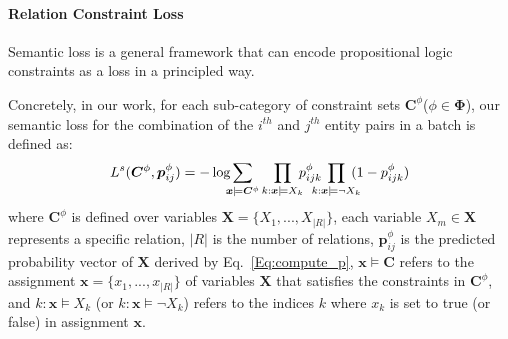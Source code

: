 \paragraph{Relation Constraint Loss}
Semantic loss is a general framework that can encode propositional logic constraints as a loss in a principled way.

Concretely, in our work, for each sub-category of constraint sets $\bm{C}^{\phi}$($\phi \in \bm{\Phi}$), our semantic loss for the combination of the $i^{th}$ and $j^{th}$ entity pairs in a batch is defined as:
\begin{equation}
\label{seq:semantic_loss}
	L^{s}(\bm{C}^{\phi}, \bm{p}^{\phi}_{ij}) = -\log\hspace{-0.5em}\sum\limits_{\bm x\models\bm{C}^{\phi}}\prod\limits_{k:\bm x\models X_k}\hspace{-0.5em}p^{\phi}_{ijk}\hspace{-0.9em}\prod\limits_{k:\bm x\models \neg X_k}\hspace{-0.7em}(1-p^{\phi}_{ijk})
\end{equation}
where $\bm{C}^{\phi}$ is defined over variables $\bm{X}=\{X_1,...,X_{|R|}\}$,
each variable $X_m \in \bm{X}$ represents a specific relation,
$|R|$ is the number of relations,
$\bm{p}^{\phi}_{ij}$ is the predicted probability vector of $\bm{X}$ derived by Eq.~\ref{Eq:compute_p},
$\bm x \models \bm{C}$ refers to the assignment $\bm{x} = \{x_1,...,x_{|R|}\}$ of variables $\bm X$ that satisfies the constraints in $\bm{C}^{\phi}$,
and $k\colon\bm x \models X_k$ (or $k\colon\bm x\models \neg X_k$) refers to the indices $k$ where $x_k$ is set to true (or false) in assignment $\bm x$.
